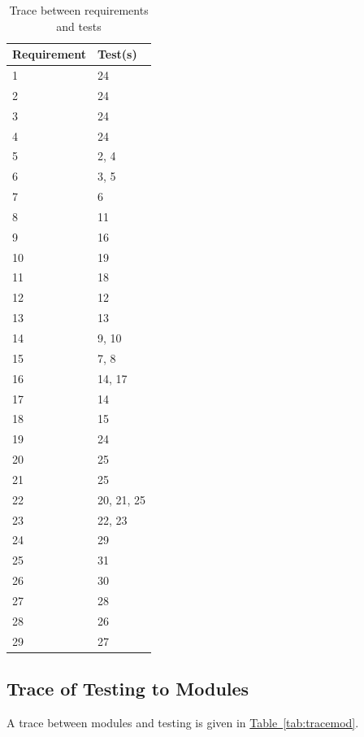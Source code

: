 \documentclass[12pt, titlepage]{article}
\begin{document}
\begin{table}[h]
\caption{Trace between requirements and tests} \label{tab:tracereq}
\centering
\begin{tabularx}{0.55\textwidth}{p{4cm}X}
\toprule {\bf Requirement} & {\bf Test(s)}\\
\midrule
1	&	24	\\
2	&	24	\\
3	&	24	\\
4	&	24	\\
5	&	2, 4	\\
6	&	3, 5	\\
7	&	6	\\
8	&	11	\\
9	&	16\\
10	&	19	\\
11	&	18	\\
12	&	12	\\
13	&	13	\\
14	&	9, 10	\\
15	&	7, 8	\\
16	&	14, 17	\\
17	&	14	\\
18	&	15	\\
19	&	24	\\
20	&	25	\\
21	&	25	\\
22	&	20, 21, 25	\\
23	&	22, 23	\\
24	&	29	\\
25	&	31	\\
26	&	30	\\
27	&	28	\\
28  &    26   \\
29  &    27   \\
\bottomrule
\end{tabularx}
\end{table}
\subsection{Trace of Testing to Modules}
A trace between modules and testing is given in \hyperref[tab:tracemod]{Table~\ref*{tab:tracemod}}.\\
\end{document}

